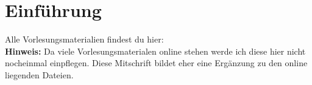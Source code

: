 
\chapter{Einführung}
Alle Vorlesungsmaterialien findest du hier:\\
\nl
\textbf{Hinweis:} Da viele Vorlesungsmaterialen online stehen werde ich diese hier nicht nocheinmal einpflegen.
Diese Mitschrift bildet eher eine Ergänzung zu den online liegenden Dateien.

